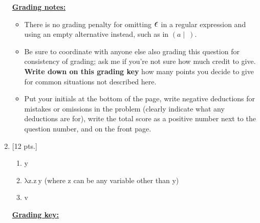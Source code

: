 \documentclass[11pt,fleqn]{article}
\begin{document}
\begin{enumerate}
\begin{info}{\textbf{\underline{Grading notes:}}}
\begin{itemize}
              \item There is no grading penalty for omitting $\mbox{\Large \ensuremath{\epsilon}}$
                    in a regular expression and using an empty alternative
                    instead, such as in $(a \mid \: )$.

              \item Be sure to coordinate with anyone else also grading this
                    question for consistency of grading; ask me if you're
                    not sure how much credit to give.  \textbf{Write down on
                    this grading key} how many points you decide to give
                    for common situations not described here.

              \item Put your initials at the bottom of the page, write
                    negative deductions for mistakes or omissions in the
                    problem (clearly indicate what any deductions are for),
                    write the total score as a positive number next to the
                    question number, and on the front page.

            \end{itemize}

          \end{info}

          \pagebreak


    \item {[12 pts.]}

          \begin{enumerate}

            \vspace{-2.75mm}

            \addtolength{\itemsep}{4mm}

            \item y

            \item $\mathrm{\lambda z.z \: y}$ (where z can be any variable
                  other than y)

            \item v

          \end{enumerate}

          \begin{info}{\textbf{\underline{Grading key:}}}

            \begin{itemize}


\end{itemize}
\end{info}
\end{enumerate}
\end{document}

